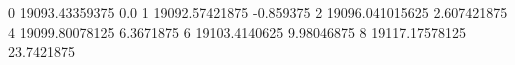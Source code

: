0 19093.43359375 0.0
1 19092.57421875 -0.859375
2 19096.041015625 2.607421875
4 19099.80078125 6.3671875
6 19103.4140625 9.98046875
8 19117.17578125 23.7421875
